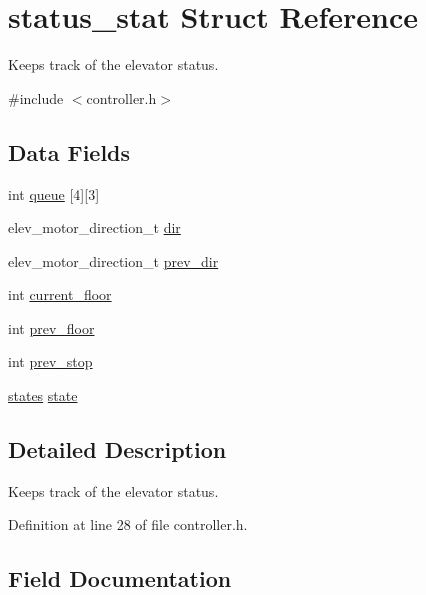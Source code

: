 \hypertarget{structstatus__stat}{}\section{status\+\_\+stat Struct Reference}
\label{structstatus__stat}


Keeps track of the elevator status.  




{\ttfamily \#include $<$controller.\+h$>$}

\subsection*{Data Fields}
\begin{DoxyCompactItemize}
\item 
int \hyperlink{structstatus__stat_ad8dbbabdd11cad499360434a98fc4800}{queue} \mbox{[}4\mbox{]}\mbox{[}3\mbox{]}
\item 
elev\+\_\+motor\+\_\+direction\+\_\+t \hyperlink{structstatus__stat_a86473b5ad6efc13580fd36cd74490f8f}{dir}
\item 
elev\+\_\+motor\+\_\+direction\+\_\+t \hyperlink{structstatus__stat_a57dbf007f4cf7b8d0b2872a99f5e6f62}{prev\+\_\+dir}
\item 
int \hyperlink{structstatus__stat_afb8f4c42e97ba9ede62ba17a2f157757}{current\+\_\+floor}
\item 
int \hyperlink{structstatus__stat_a4ccf00bc4cb3475a93c3bf5eb2a9a819}{prev\+\_\+floor}
\item 
int \hyperlink{structstatus__stat_a7dd508943eea5b0fca1ab663c7d520fc}{prev\+\_\+stop}
\item 
\hyperlink{controller_8h_ada5afb1226f3d604e014674fa0448069}{states} \hyperlink{structstatus__stat_ac485f83fea98239454b3ec1eb49e29cc}{state}
\end{DoxyCompactItemize}


\subsection{Detailed Description}
Keeps track of the elevator status. 

Definition at line 28 of file controller.\+h.



\subsection{Field Documentation}
